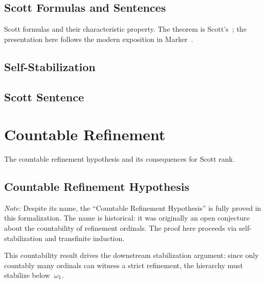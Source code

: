 
\section{Scott Formulas and Sentences}

Scott formulas and their characteristic property.  The theorem is
Scott's~\cite{scott1965}; the presentation here follows the modern exposition in
Marker~\cite[Ch.~2]{marker2016}.



\section{Self-Stabilization}


\section{Scott Sentence}




\chapter{Countable Refinement}

The countable refinement hypothesis and its consequences for Scott rank.

\section{Countable Refinement Hypothesis}


\emph{Note:} Despite its name, the ``Countable Refinement Hypothesis'' is fully
proved in this formalization.  The name is historical: it was originally an
open conjecture about the countability of refinement ordinals.  The proof here
proceeds via self-stabilization and transfinite induction.

This countability result drives the downstream stabilization argument: since
only countably many ordinals can witness a strict refinement, the hierarchy
must stabilize below~$\omega_1$.

